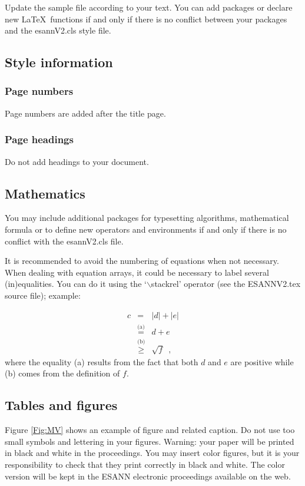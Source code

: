 \documentclass{esannV2}
\begin{document}
Update the sample file according to your text. You can add
packages or declare new \LaTeX\ functions if and only if there is no conflict between your packages and the esannV2.cls style file.

\subsection{Style information}

\subsubsection{Page numbers}

Page numbers are added after the title page.

\subsubsection{Page headings}

Do not add headings to your document.

\subsection{Mathematics}

You may include additional packages for typesetting
algorithms, mathematical formula or to define new operators and environments
if and only if there is no conflict with the esannV2.cls
file.

It is recommended to avoid the numbering of equations when not
necessary. When dealing with equation arrays, it could be
necessary to label several (in)equalities. You can do it using the
`$\backslash$stackrel' operator (see the ESANNV2.tex source file);
example:

\begin{eqnarray}
c&=&|d|+|e|\nonumber\\
&\stackrel{\text{(a)}}{=}&d+e\nonumber\\
&\stackrel{\text{(b)}}{\geq}&\sqrt{f}\enspace,
\end{eqnarray}
\noindent where the equality (a) results from the fact that both
$d$ and $e$ are positive while (b) comes from the definition of
$f$.

\subsection{Tables and figures}

Figure \ref{Fig:MV} shows an example of figure and related
caption.  Do not use too small symbols and lettering in your
figures.  Warning: your paper will be printed in black and white
in the proceedings.  You may insert color figures, but it is your
responsibility to check that they print correctly in black and
white.  The color version will be kept in the ESANN electronic
proceedings available on the web.
\end{document}
